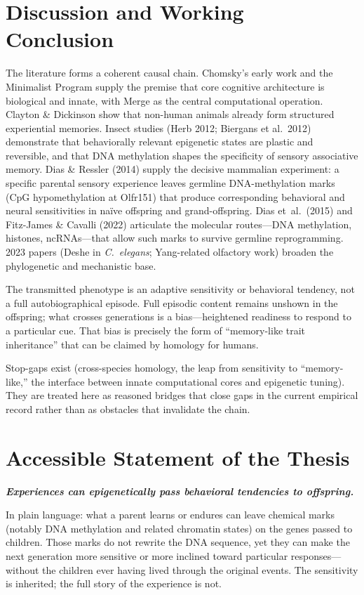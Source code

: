 \documentclass[11pt,a4paper]{article}
\begin{document}
\section{Discussion and Working Conclusion}
The literature forms a coherent causal chain. Chomsky's early work and the Minimalist Program supply the premise that core cognitive architecture is biological and innate, with Merge as the central computational operation. Clayton \& Dickinson show that non-human animals already form structured experiential memories. Insect studies (Herb 2012; Biergans et al.\ 2012) demonstrate that behaviorally relevant epigenetic states are plastic and reversible, and that DNA methylation shapes the specificity of sensory associative memory. Dias \& Ressler (2014) supply the decisive mammalian experiment: a specific parental sensory experience leaves germline DNA-methylation marks (CpG hypomethylation at Olfr151) that produce corresponding behavioral and neural sensitivities in na\"ive offspring and grand-offspring. Dias et~al.\ (2015) and Fitz-James \& Cavalli (2022) articulate the molecular routes---DNA methylation, histones, ncRNAs---that allow such marks to survive germline reprogramming. 2023 papers (Deshe in \textit{C.\ elegans}; Yang-related olfactory work) broaden the phylogenetic and mechanistic base.

The transmitted phenotype is an adaptive sensitivity or behavioral tendency, not a full autobiographical episode. Full episodic content remains unshown in the offspring; what crosses generations is a bias---heightened readiness to respond to a particular cue. That bias is precisely the form of ``memory-like trait inheritance'' that can be claimed by homology for humans.

Stop-gaps exist (cross-species homology, the leap from sensitivity to ``memory-like,'' the interface between innate computational cores and epigenetic tuning). They are treated here as reasoned bridges that close gaps in the current empirical record rather than as obstacles that invalidate the chain.

\section{Accessible Statement of the Thesis}
\begin{center}
\large\textit{\textbf{Experiences can epigenetically pass behavioral tendencies to offspring.}}
\end{center}

\vspace{0.4em}
In plain language: what a parent learns or endures can leave chemical marks (notably DNA methylation and related chromatin states) on the genes passed to children. Those marks do not rewrite the DNA sequence, yet they can make the next generation more sensitive or more inclined toward particular responses---without the children ever having lived through the original events. The sensitivity is inherited; the full story of the experience is not.
\end{document}
